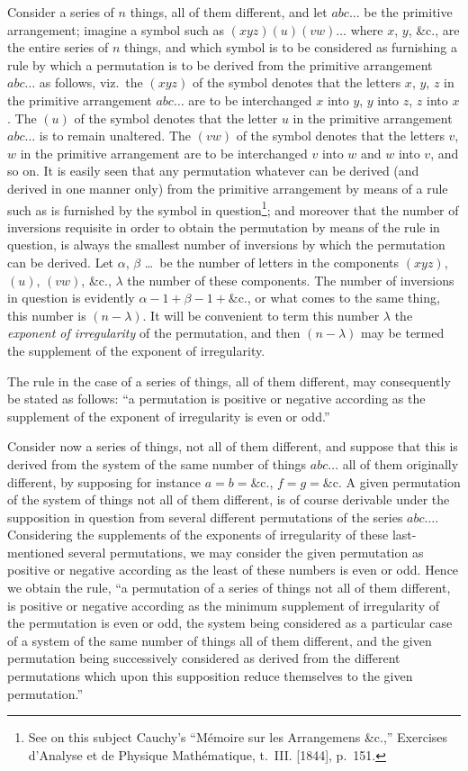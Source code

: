 \documentclass[11pt,a4paper]{book}
\begin{document}
Consider a series of $n$ things, all of them different, and let $abc\ldots$ be the primitive arrangement; imagine a symbol such as $(xyz)(u)(vw)\ldots$ where $x$, $y$, \&c., are the entire series of $n$ things, and which symbol is to be considered as furnishing a rule by which a permutation is to be derived from the primitive arrangement $abc\ldots$ as follows, viz.\ the $(xyz)$ of the symbol denotes that the letters $x$, $y$, $z$ in the primitive arrangement $abc\ldots$ are to be interchanged $x$ into $y$, $y$ into $z$, $z$ into $x$. The $(u)$ of the symbol denotes that the letter $u$ in the primitive arrangement $abc\ldots$ is to remain unaltered. The $(vw)$ of the symbol denotes that the letters $v$, $w$ in the primitive arrangement are to be interchanged $v$ into $w$ and $w$ into $v$, and so on. It is easily seen that any permutation whatever can be derived (and derived in one manner only) from the primitive arrangement by means of a rule such as is furnished by the symbol in question\footnote{See on this subject Cauchy's ``M\'{e}moire sur les Arrangemens \&c.,'' Exercises d'Analyse et de Physique Math\'{e}matique, t.~III. [1844], p.~151.}; and moreover that the number of inversions requisite in order to obtain the permutation by means of the rule in question, is always the smallest number of inversions by which the permutation can be derived. Let $\alpha$, $\beta$ \ldots\ be the number of letters in the components $(xyz)$, $(u)$, $(vw)$, \&c., $\lambda$ the number of these components. The number of inversions in question is evidently $\alpha-1 + \beta-1 + \&$c., or what comes to the same thing, this number is $(n - \lambda)$. It will be convenient to term this number $\lambda$ the \textit{exponent of irregularity} of the permutation, and then $(n - \lambda)$ may be termed the supplement of the exponent of irregularity.

The rule in the case of a series of things, all of them different, may consequently be stated as follows: ``a permutation is positive or negative according as the supplement of the exponent of irregularity is even or odd.''

Consider now a series of things, not all of them different, and suppose that this is derived from the system of the same number of things $abc\ldots$ all of them originally different, by supposing for instance $a = b = \&$c., $f = g = \&$c. A given permutation of the system of things not all of them different, is of course derivable under the supposition in question from several different permutations of the series $abc\ldots$. Considering the supplements of the exponents of irregularity of these last-mentioned several permutations, we may consider the given permutation as positive or negative according as the least of these numbers is even or odd. Hence we obtain the rule, ``a permutation of a series of things not all of them different, is positive or negative according as the minimum supplement of irregularity of the permutation is even or odd, the system being considered as a particular case of a system of the same number of things all of them different, and the given permutation being successively considered as derived from the different permutations which upon this supposition reduce themselves to the given permutation.''
\end{document}
